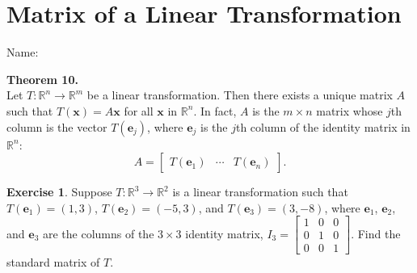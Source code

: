 \documentclass[10pt]{book}
\newcommand{\boxcolor}{gray!30}
\newenvironment{boxthm}{\begin{mdframed}[backgroundcolor=\boxcolor,nobreak=true]}{\end{mdframed}}
\theoremstyle{definition}
\newtheorem{exercise}{Exercise}[section]
\newcommand{\name}[1][2.5in]{\vspace{-2.3em}\hfill Name: \underline{\hspace{#1}}}
\newcommand{\R}{\mathbb{R}}
\newcommand{\vect}[1]{\ensuremath{\boldsymbol{\mathbf{#1}}}}
\newcommand{\Ax}{A\vect{x}}
\newcommand{\Tx}{T(\vect{x})}
\newcommand{\ve}[1]{\vect{e}_{#1}}
\newcommand{\Te}[1]{T(\ve{#1})}
\newcommand{\Tmap}[2]{T:\R^{#1}\to\R^{#2}}
\begin{document}
\newpage


\section[The Matrix of a Linear Transformation]{Matrix of a Linear Transformation}
\name[2in]

\begin{boxthm}
	\textbf{Theorem 10.} \\
	Let $T:\R^n\to\R^m$ be a linear transformation. Then there exists a unique matrix $A$ such that $\Tx=\Ax$ for all $\vect{x}$ in $\R^n$. In fact, $A$ is the $m\times n$ matrix whose $j$th column is the vector $\Te{j}$, where $\ve{j}$ is the $j$th column of the identity matrix in $\R^n$:
	$$ A = \begin{bmatrix}\Te1 & \cdots & \Te{n}\end{bmatrix}. $$
\end{boxthm}

\begin{exercise} %
	Suppose $\Tmap{3}{2}$ is a linear transformation such that $\Te1=(1,3)$, $\Te2=(-5,3)$, and $\Te3=(3,-8)$, where $\ve1$, $\ve2$, and $\ve3$ are the columns of the $3\times 3$ identity matrix, $I_3=\begin{bmatrix}1&0&0\\0&1&0\\0&0&1\end{bmatrix}$. Find the standard matrix of $T$.
\end{exercise}
\vfill
\end{document}
